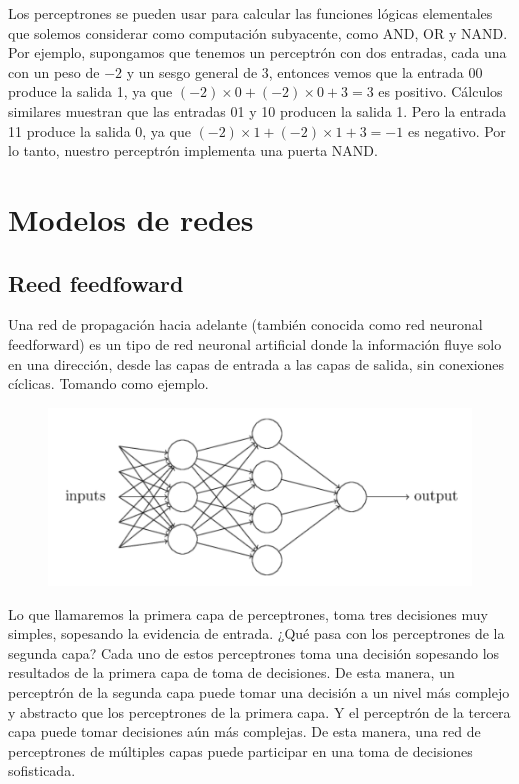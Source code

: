 Los perceptrones se pueden usar para calcular las funciones lógicas elementales que solemos considerar como computación subyacente, como AND, OR y NAND. Por ejemplo, supongamos que tenemos un perceptrón con dos entradas, cada una con un peso de $-2$ y un sesgo general de $3$, entonces vemos que la entrada $00$ produce la salida 1, ya que $(-2)\times 0 + (-2)\times 0 + 3 = 3$ es positivo. Cálculos similares muestran que las entradas 01 y 10 producen la salida 1. Pero la entrada 11 produce la salida 0, ya que $(-2)\times 1 + (-2)\times 1 + 3 = -1$ es negativo. Por lo tanto, nuestro perceptrón implementa una puerta NAND.

\clearpage

\section{Modelos de redes}

\subsection{Reed feedfoward}

Una red de propagación hacia adelante (también conocida como red neuronal feedforward) es un tipo de red neuronal artificial donde la información fluye solo en una dirección, desde las capas de entrada a las capas de salida, sin conexiones cíclicas. Tomando como ejemplo.
\begin{figure}[h!]
    \centering
    \includegraphics[width=0.5\linewidth]{imagen2.png}
\end{figure}
Lo que llamaremos la primera capa de perceptrones, toma tres decisiones muy simples, sopesando la evidencia de entrada. ¿Qué pasa con los perceptrones de la segunda capa? Cada uno de estos perceptrones toma una decisión sopesando los resultados de la primera capa de toma de decisiones. De esta manera, un perceptrón de la segunda capa puede tomar una decisión a un nivel más complejo y abstracto que los perceptrones de la primera capa. Y el perceptrón de la tercera capa puede tomar decisiones aún más complejas. De esta manera, una red de perceptrones de múltiples capas puede participar en una toma de decisiones sofisticada.

